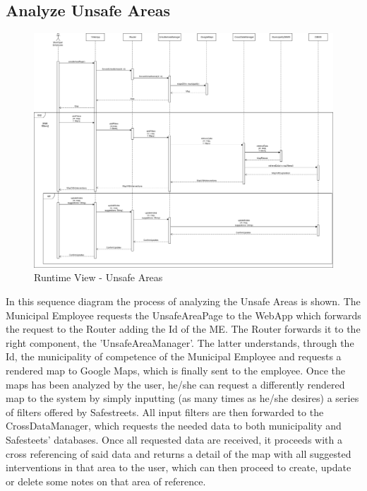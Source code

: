        \subsection{Analyze Unsafe Areas}
        \begin{figure}[H]
            \includegraphics[scale=0.28]{dd/resources/images/RuntimeView-UnsafeAreas}
            \caption{Runtime View - Unsafe Areas}        
        \end{figure}
        In this sequence diagram the process of analyzing the Unsafe Areas is
        shown. The Municipal Employee requests the UnsafeAreaPage to the WebApp
        which forwards the request to the Router adding the Id of the ME. 
        The Router forwards it to the right component, the
        'UnsafeAreaManager'. The latter understands, through the Id, the
        municipality of competence of the Municipal Employee and requests a rendered map to
        Google Maps, which is finally sent to the employee. Once the maps has been analyzed by the 
        user, he/she can request a differently rendered map to the system by simply 
        inputting (as many times as he/she desires) a series of filters offered by Safestreets.
        All input filters are then forwarded to the CrossDataManager, which requests the needed data
        to both municipality and Safesteets' databases. Once all requested data are received, it 
        proceeds with a cross referencing of said data and returns a detail of the map with all 
        suggested interventions in that area to the user, which can then proceed to create, update 
        or delete some notes on that area of reference.
        
